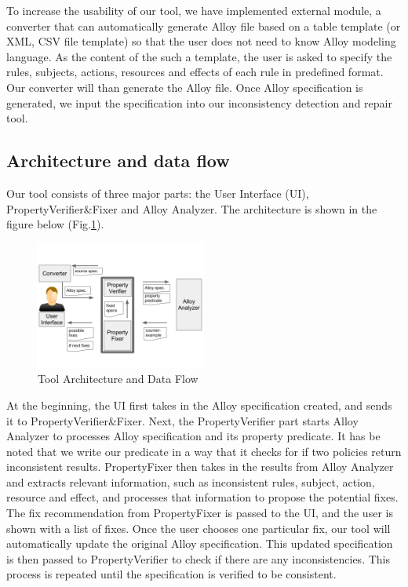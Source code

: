 \documentclass[letterpaper]{acm_proc_article-sp}
\begin{document}
To increase the usability of our tool, we have implemented external module, a converter that can automatically generate Alloy file based on a table template (or XML, CSV file template) so that the user does not need to know Alloy modeling language. As the content of the such a template, the user is asked to specify the rules, subjects, actions, resources and effects of each rule in predefined format. Our converter will than generate the Alloy file. Once Alloy specification is generated, we input the specification into our inconsistency detection and repair tool. 

\subsection{Architecture and data flow}

Our tool consists of three major parts: the User Interface (UI), PropertyVerifier\&Fixer and Alloy Analyzer. The architecture is shown in the figure below (Fig.\ref{fig:Architecture}).\\

\begin{figure}[h]
\includegraphics[width=0.5\textwidth]{dataflow.png}
\caption{Tool Architecture and Data Flow}    
  \label{fig:Architecture}
\end{figure}

At the beginning, the UI first takes in the Alloy specification created, and sends it to PropertyVerifier\&Fixer. Next, the PropertyVerifier part starts Alloy Analyzer to processes Alloy specification and its property predicate. It has be noted that we write our predicate in a way that it checks for if two policies return inconsistent results. PropertyFixer then takes in the results from Alloy Analyzer and extracts relevant information, such as inconsistent rules, subject, action, resource and effect, and processes that information to propose the potential fixes. The fix recommendation from PropertyFixer is passed to the UI, and the user is shown with a list of fixes. Once the user chooses one particular fix, our tool will automatically update the original Alloy specification. This updated specification is then passed to PropertyVerifier to check if there are any inconsistencies. This process is repeated until the specification is verified to be consistent.
\end{document}

